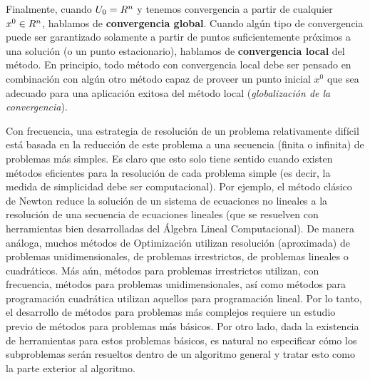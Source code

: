 Finalmente, cuando $U_0 = R^n$ y tenemos convergencia a partir de cualquier $x^0 \in R^n$, hablamos de \textbf{convergencia global}. Cuando algún tipo de convergencia puede ser garantizado solamente a partir de puntos suficientemente próximos a una solución (o un punto estacionario), hablamos de \textbf{convergencia local} del método. En principio, todo método con convergencia local debe ser pensado en combinación con algún otro método capaz de proveer un punto inicial $x^0$ que sea adecuado para una aplicación exitosa del método local (\textit{globalización de la convergencia}).

Con frecuencia, una estrategia de resolución de un problema relativamente difícil está basada en la reducción de este problema a una secuencia (finita o infinita) de problemas más simples. Es claro que esto solo tiene sentido cuando existen métodos eficientes para la resolución de cada problema simple (es decir, la medida de simplicidad debe ser computacional). Por ejemplo, el método clásico de Newton reduce la solución de un sistema de ecuaciones no lineales a la resolución de una secuencia de ecuaciones lineales (que se resuelven con herramientas bien desarrolladas del Álgebra Lineal Computacional). De manera análoga, muchos métodos de Optimización utilizan resolución (aproximada) de problemas unidimensionales, de problemas irrestrictos, de problemas lineales o cuadráticos. Más aún, métodos para problemas irrestrictos utilizan, con frecuencia, métodos para problemas unidimensionales, así como métodos para programación cuadrática utilizan aquellos para programación lineal. Por lo tanto, el desarrollo de métodos para problemas más complejos requiere un estudio previo de métodos para problemas más básicos. Por otro lado, dada la existencia de herramientas para estos problemas básicos, es natural no especificar cómo los subproblemas serán resueltos dentro de un algoritmo general y tratar esto como la parte exterior al algoritmo.
